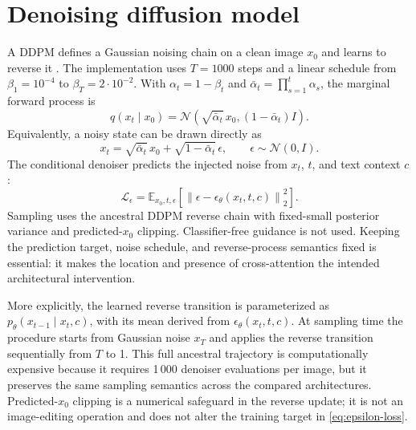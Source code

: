 \section{Denoising diffusion model}\label{sec:ddpm}
A DDPM defines a Gaussian noising chain on a clean image $x_0$ and learns to reverse it \parencite{ho2020ddpm}. The implementation uses $T=1000$ steps and a linear schedule from $\beta_1=10^{-4}$ to $\beta_T=2\cdot10^{-2}$. With $\alpha_t=1-\beta_t$ and $\bar\alpha_t=\prod_{s=1}^{t}\alpha_s$, the marginal forward process is
\begin{equation}\label{eq:forward-diffusion}
q(x_t\mid x_0)=\mathcal{N}\!\left(\sqrt{\bar\alpha_t}\,x_0,(1-\bar\alpha_t)I\right).
\end{equation}
Equivalently, a noisy state can be drawn directly as
\begin{equation}\label{eq:reparameterization}
x_t=\sqrt{\bar\alpha_t}\,x_0+\sqrt{1-\bar\alpha_t}\,\epsilon,
\qquad \epsilon\sim\mathcal{N}(0,I).
\end{equation}
The conditional denoiser predicts the injected noise from $x_t$, $t$, and text context $c$:
\begin{equation}\label{eq:epsilon-loss}
\mathcal{L}_{\epsilon}=\mathbb{E}_{x_0,t,\epsilon}\left[\left\lVert\epsilon-\epsilon_\theta(x_t,t,c)\right\rVert_2^2\right].
\end{equation}
Sampling uses the ancestral DDPM reverse chain with fixed-small posterior variance and predicted-$x_0$ clipping. Classifier-free guidance is not used. Keeping the prediction target, noise schedule, and reverse-process semantics fixed is essential: it makes the location and presence of cross-attention the intended architectural intervention.

More explicitly, the learned reverse transition is parameterized as $p_\theta(x_{t-1}\mid x_t,c)$, with its mean derived from $\epsilon_\theta(x_t,t,c)$. At sampling time the procedure starts from Gaussian noise $x_T$ and applies the reverse transition sequentially from $T$ to 1. This full ancestral trajectory is computationally expensive because it requires 1\,000 denoiser evaluations per image, but it preserves the same sampling semantics across the compared architectures. Predicted-$x_0$ clipping is a numerical safeguard in the reverse update; it is not an image-editing operation and does not alter the training target in \cref{eq:epsilon-loss}.
